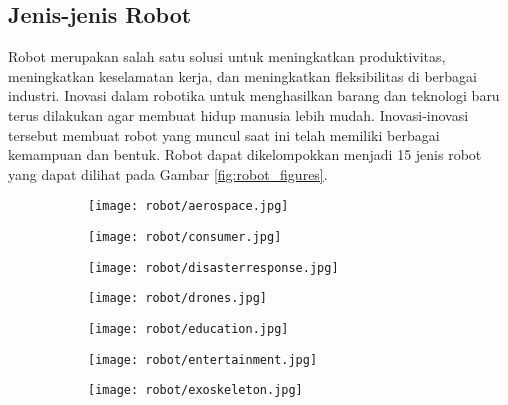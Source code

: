 \subsection{Jenis-jenis Robot}
\label{sec:Robot_Jenis}

Robot merupakan salah satu solusi untuk meningkatkan produktivitas, meningkatkan keselamatan kerja, dan meningkatkan fleksibilitas di berbagai industri. Inovasi dalam robotika untuk menghasilkan barang dan teknologi baru terus dilakukan agar membuat hidup manusia lebih mudah. Inovasi-inovasi tersebut membuat robot yang muncul saat ini telah memiliki berbagai kemampuan dan bentuk. Robot dapat dikelompokkan menjadi 15 jenis robot yang dapat dilihat pada Gambar \ref*{fig:robot_figures}\cite{b1}.

\begin{figure}[H]
    \centering
    \begin{subfigure}[b]{.23\textwidth}
        \texttt{[image: robot/aerospace.jpg]}
        \caption{}
        \label{rob:subfig1}
    \end{subfigure}
    \begin{subfigure}[b]{.23\textwidth}
        \texttt{[image: robot/consumer.jpg]}
        \caption{}
        \label{rob:subfig3}
    \end{subfigure}
    \begin{subfigure}[b]{.23\textwidth}
        \texttt{[image: robot/disasterresponse.jpg]}
        \caption{}
        \label{rob:subfig4}
    \end{subfigure}
    \begin{subfigure}[b]{.23\textwidth}
        \texttt{[image: robot/drones.jpg]}
        \caption{}
        \label{rob:subfig5}
    \end{subfigure}
    \begin{subfigure}[b]{.23\textwidth}        
        \texttt{[image: robot/education.jpg]}
        \caption{}
        \label{rob:subfig6}
    \end{subfigure}
    \begin{subfigure}[b]{.23\textwidth}
        \texttt{[image: robot/entertainment.jpg]}
        \caption{}
        \label{rob:subfig7}
    \end{subfigure}
    \begin{subfigure}[b]{.23\textwidth}
        \texttt{[image: robot/exoskeleton.jpg]}
        \caption{}

\end{subfigure}
\end{figure}
